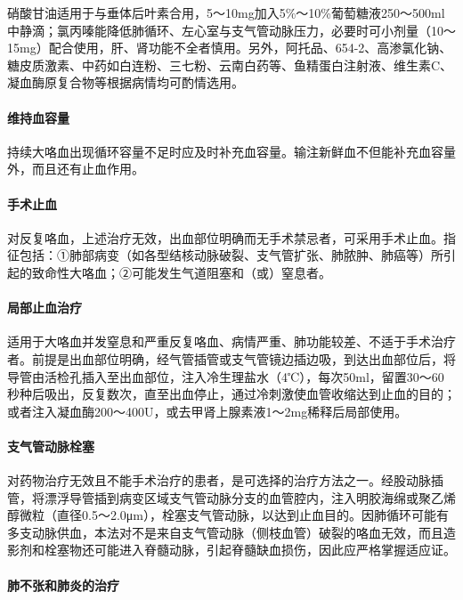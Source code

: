 硝酸甘油适用于与垂体后叶素合用，5～10mg加入5\%～10\%葡萄糖液250～500ml中静滴；氯丙嗪能降低肺循环、左心室与支气管动脉压力，必要时可小剂量（10～15mg）配合使用，肝、肾功能不全者慎用。另外，阿托品、654-2、高渗氯化钠、糖皮质激素、中药如白连粉、三七粉、云南白药等、鱼精蛋白注射液、维生素C、凝血酶原复合物等根据病情均可酌情选用。

\paragraph{维持血容量}

持续大咯血出现循环容量不足时应及时补充血容量。输注新鲜血不但能补充血容量外，而且还有止血作用。

\paragraph{手术止血}

对反复咯血，上述治疗无效，出血部位明确而无手术禁忌者，可采用手术止血。指征包括：①肺部病变（如各型结核动脉破裂、支气管扩张、肺脓肿、肺癌等）所引起的致命性大咯血；②可能发生气道阻塞和（或）窒息者。

\paragraph{局部止血治疗}

适用于大咯血并发窒息和严重反复咯血、病情严重、肺功能较差、不适于手术治疗者。前提是出血部位明确，经气管插管或支气管镜边插边吸，到达出血部位后，将导管由活检孔插入至出血部位，注入冷生理盐水（4℃），每次50ml，留置30～60秒种后吸出，反复数次，直至出血停止，通过冷刺激使血管收缩达到止血的目的；或者注入凝血酶200～400U，或去甲肾上腺素液1～2mg稀释后局部使用。

\paragraph{支气管动脉栓塞}

对药物治疗无效且不能手术治疗的患者，是可选择的治疗方法之一。经股动脉插管，将漂浮导管插到病变区域支气管动脉分支的血管腔内，注入明胶海绵或聚乙烯醇微粒（直径0.5～2.0μm），栓塞支气管动脉，以达到止血目的。因肺循环可能有多支动脉供血，本法对不是来自支气管动脉（侧枝血管）破裂的咯血无效，而且造影剂和栓塞物还可能进入脊髓动脉，引起脊髓缺血损伤，因此应严格掌握适应证。

\paragraph{肺不张和肺炎的治疗}

